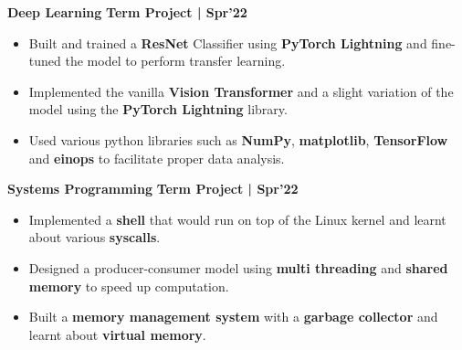 \documentclass[10pt]{article}
\begin{document}
\spacedhrule{0.15ex}{1.0ex}
\large {\textbf{Deep Learning}} \normalsize  \href{https://github.com/Abhitipu/DL-CS60010} {\hspace{0.5ex}\faGithub} {\hfill} \textbf{Term Project | Spr'22}\\[-1.75em]
\begin{itemize}
    \item Built and trained a \textbf{ResNet} Classifier using \textbf{PyTorch Lightning} and fine-tuned the model to perform transfer learning. \\[-2em]
    \item Implemented the vanilla \textbf{Vision Transformer} and a slight variation of the model using the \textbf{PyTorch Lightning} library.\\[-2em]
    \item Used various python libraries such as \textbf{NumPy}, \textbf{matplotlib}, \textbf{TensorFlow} and \textbf{einops} to facilitate proper data analysis.
    \\[-0.75em]
\end{itemize}
\vspace{-0.5ex}
\large {\textbf{Systems Programming}} \normalsize \href{https://github.com/Abhitipu/OS-CS39002}{\faGithub} {\hfill} \textbf{Term Project | Spr'22}\\[-1.8em]
\begin{itemize}
    \item Implemented a \textbf{shell} that would run on top of the Linux kernel and learnt about various \textbf{syscalls}.\\[-2em]
    \item Designed a producer-consumer model using \textbf{multi threading} and \textbf{shared memory} to speed up computation.\\[-2em]
    \item Built a \textbf{memory management system} with a \textbf{garbage collector} and learnt about \textbf{virtual memory}.\\[-1em]
\end{itemize}
\end{document}
